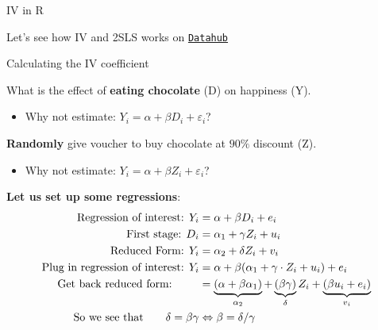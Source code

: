 \documentclass[11pt,xcolor=table]{beamer}
\begin{document}
\begin{frame}{IV in R}


\alert{Let's see how IV and 2SLS works on \texttt{\alert{\href{https://datahub.berkeley.edu/hub/user-redirect/git-pull?repo=https\%3A\%2F\%2Fgithub.com\%2Fryanedw\%2FECON-140-FA23-RDE&branch=main&urlpath=tree\%2FECON-140-FA23-RDE\%2F}{Datahub}}}}
\end{frame}







\begin{frame}{Calculating the IV coefficient}
    
What is the effect of \textbf{eating chocolate} (D) on happiness (Y).
\begin{itemize}
    \item Why not estimate: $Y_i = \alpha + \beta D_i + \varepsilon_i$?
\end{itemize}
\textbf{Randomly} give voucher to buy chocolate at $90 \%$ discount (Z).

\begin{itemize}
    \item Why not estimate: $Y_i = \alpha + \beta Z_i + \varepsilon_i$?
\end{itemize}
\textbf{Let us set up some regressions}:
\begin{align*}
\text{Regression of interest: }  Y_i&=\alpha+\beta  D_i +  e_i \\
\text{First stage: }  D_i&=\alpha_1+\gamma  Z_i + u_i \\
\text{Reduced Form: }  Y_i&=\alpha_2+\delta  Z_i + v_i \\
\text{Plug in regression of interest: }  Y_i &= \alpha + \beta (\alpha_1+\gamma \cdot Z_i + u_i) + e_i   \\ 
\text{Get back reduced form: \qquad }& = \underbrace{(\alpha + \beta \alpha_1)}_{\alpha_2} + \underbrace{(\beta \gamma)}_{\delta} Z_i + \underbrace{(\beta u_i + e_i)}_{v_i}  \\
 \text{So we see that} \qquad    \delta = \beta \gamma &\Leftrightarrow \beta = \delta / \gamma
\end{align*}





\end{frame}
\end{document}
